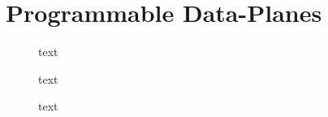 \section{Programmable Data-Planes}

\begin{figure}
	\caption{text}\label{fig:pdp-lit-steering}
\end{figure}

\begin{figure}
	\caption{text}\label{fig:pdp-lit-pci}
\end{figure}

\begin{figure}
	\caption{text}\label{fig:pdp-lit-offloading}
\end{figure}

